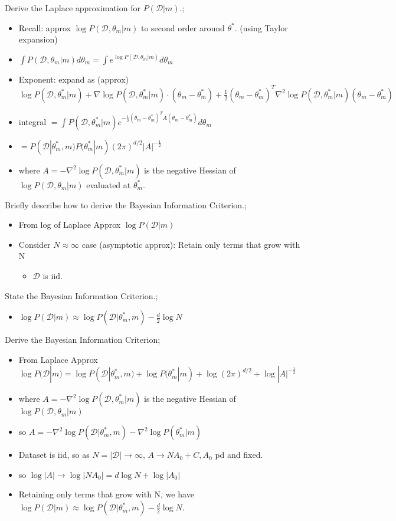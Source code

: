 \documentclass{article}
\begin{document}
Derive the Laplace approximation for $P(\mathcal{D}|m)$.; \begin{itemize} \item Recall: approx $\log P(\mathcal{D},\theta_m|m)$ to second order around $\theta^*$. (using Taylor expansion) \item $\int P(\mathcal{D},\theta_m|m)d\theta_m = \int e^{\log P(\mathcal{D},\theta_m|m)}d\theta_m$ \item Exponent: expand as (approx) $\log P(\mathcal{D},\theta^*_m|m) + \nabla \log P(\mathcal{D},\theta^*_m|m)\cdot (\theta_m-\theta_m^*)+\frac{1}{2}(\theta_m-\theta_m^*)^T\nabla^2\log P(\mathcal{D},\theta^*_m|m)(\theta_m-\theta_m^*)$ \item integral $=\int P(\mathcal{D},\theta^*_m|m)e^{-\frac{1}{2}(\theta_m-\theta_m^*)^TA(\theta_m-\theta_m^*)}d\theta_m$ \item $=P(\mathcal{D}|\theta^*_m, m)P(\theta^*_m|m)(2\pi)^{d/2}|A|^{-\frac{1}{2}}$ \item where $A=-\nabla^2\log P(\mathcal{D},\theta^*_m|m)$ is the negative Hessian of $\log P(\mathcal{D},\theta_m|m)$ evaluated at $\theta^*_m$.\end{itemize}

Briefly describe how to derive the Bayesian Information Criterion.; \begin{itemize} \item From log of Laplace Approx $\log P(\mathcal{D}|m)$ \item Consider $N\approx\infty$ case (asymptotic approx): Retain only terms that grow with N \begin{itemize} \item $\mathcal{D}$ is iid.  \end{itemize} \end{itemize}

State the Bayesian Information Criterion.; \begin{itemize} \item $\log P(\mathcal{D}|m)\approx \log P(\mathcal{D}|\theta^*_m, m)-\frac{d}{2}\log N$ \end{itemize}

Derive the Bayesian Information Criterion; \begin{itemize} \item From Laplace Approx $\log P(\mathcal{D}|m)=\log P(\mathcal{D}|\theta^*_m, m) + \log P(\theta^*_m|m) + \log (2\pi)^{d/2} + \log|A|^{-\frac{1}{2}}$ \item where $A=-\nabla^2\log P(\mathcal{D},\theta^*_m|m)$ is the negative Hessian of $\log P(\mathcal{D},\theta_m|m)$ \item so $A=-\nabla^2\log P(\mathcal{D}|\theta^*_m,m) -\nabla^2\log P(\theta^*_m|m)$ \item Dataset is iid, so as $N=|\mathcal{D}|\rightarrow\infty$, $A\rightarrow NA_0+C, A_0$ pd and fixed.  \item so $\log|A|\rightarrow\log|NA_0|=d\log N+\log|A_0|$ \item Retaining only terms that grow with N, we have $\log P(\mathcal{D}|m)\approx \log P(\mathcal{D}|\theta^*_m, m)-\frac{d}{2}\log N$.  \end{itemize}
\end{document}
